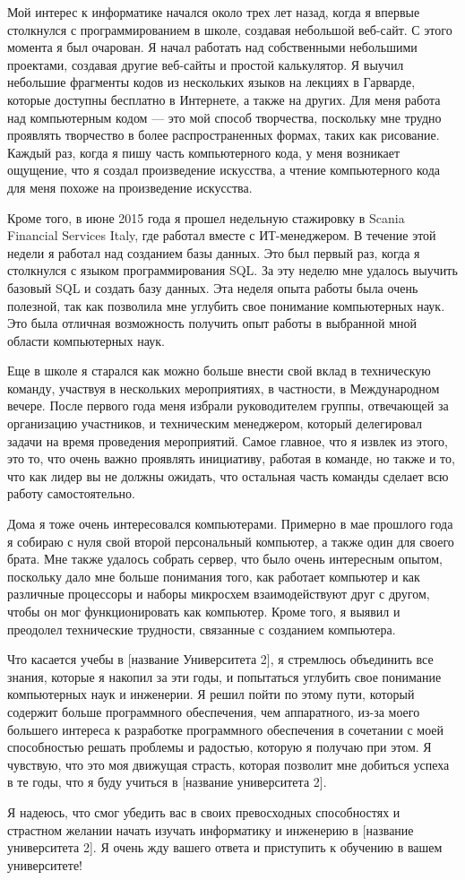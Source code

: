 Мой интерес к информатике начался около трех лет назад, когда я впервые столкнулся с программированием в школе, создавая небольшой веб-сайт. С этого момента я был очарован. Я начал работать над собственными небольшими проектами, создавая другие веб-сайты и простой калькулятор. Я выучил небольшие фрагменты кодов из нескольких языков на лекциях в Гарварде, которые доступны бесплатно в Интернете, а также на других. Для меня работа над компьютерным кодом — это мой способ творчества, поскольку мне трудно проявлять творчество в более распространенных формах, таких как рисование. Каждый раз, когда я пишу часть компьютерного кода, у меня возникает ощущение, что я создал произведение искусства, а чтение компьютерного кода для меня похоже на произведение искусства.

Кроме того, в июне 2015 года я прошел недельную стажировку в Scania Financial Services Italy, где работал вместе с ИТ-менеджером. В течение этой недели я работал над созданием базы данных. Это был первый раз, когда я столкнулся с языком программирования SQL. За эту неделю мне удалось выучить базовый SQL и создать базу данных. Эта неделя опыта работы была очень полезной, так как позволила мне углубить свое понимание компьютерных наук. Это была отличная возможность получить опыт работы в выбранной мной области компьютерных наук.

Еще в школе я старался как можно больше внести свой вклад в техническую команду, участвуя в нескольких мероприятиях, в частности, в Международном вечере. После первого года меня избрали руководителем группы, отвечающей за организацию участников, и техническим менеджером, который делегировал задачи на время проведения мероприятий. Самое главное, что я извлек из этого, это то, что очень важно проявлять инициативу, работая в команде, но также и то, что как лидер вы не должны ожидать, что остальная часть команды сделает всю работу самостоятельно.

Дома я тоже очень интересовался компьютерами. Примерно в мае прошлого года я собираю с нуля свой второй персональный компьютер, а также один для своего брата. Мне также удалось собрать сервер, что было очень интересным опытом, поскольку дало мне больше понимания того, как работает компьютер и как различные процессоры и наборы микросхем взаимодействуют друг с другом, чтобы он мог функционировать как компьютер. Кроме того, я выявил и преодолел технические трудности, связанные с созданием компьютера.

Что касается учебы в [название Университета 2], я стремлюсь объединить все знания, которые я накопил за эти годы, и попытаться углубить свое понимание компьютерных наук и инженерии. Я решил пойти по этому пути, который содержит больше программного обеспечения, чем аппаратного, из-за моего большего интереса к разработке программного обеспечения в сочетании с моей способностью решать проблемы и радостью, которую я получаю при этом. Я чувствую, что это моя движущая страсть, которая позволит мне добиться успеха в те годы, что я буду учиться в [название университета 2].

Я надеюсь, что смог убедить вас в своих превосходных способностях и страстном желании начать изучать информатику и инженерию в [название университета 2]. Я очень жду вашего ответа и приступить к обучению в вашем университете!